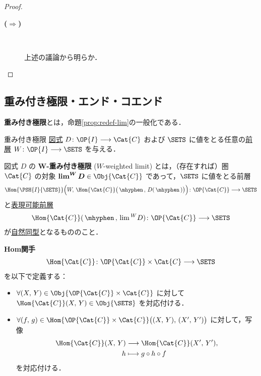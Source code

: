 \documentclass[TQFT_main]{subfiles}
\begin{document}
\begin{proof}
\begin{description}
        \item[\textbf{($\bm{\Longrightarrow}$)}]　
        
        上述の議論から明らか．
    \end{description}
\end{proof}

\subsection{重み付き極限・エンド・コエンド}

\textbf{重み付き極限}とは，命題\ref{prop:redef-lim}の一般化である．

\begin{mydef}[label=def:weighted-lim]{重み付き極限}
    \hyperref[def:diagram]{図式} $D \colon \OP{I} \lto \Cat{C}$ 
    および $\SETS$ に値をとる任意の\hyperref[def:presheaf-general]{前層} $W \colon \OP{I} \lto \SETS$ を与える．
    
    図式 $D$ の $\bm{W}$\textbf{-重み付き極限} ($W$-weighted limit) とは，（存在すれば）圏 $\Cat{C}$ の対象 $\bm{\lim^W D} \in \Obj{\Cat{C}}$ であって，$\SETS$ に値をとる前層
    \begin{align}
        \Hom{\PSH{I}{\SETS}} \Bigl( W,\, \Hom{\Cat{C}}\bigl(\, \mhyphen \,,\, D(\, \mhyphen \,) \bigr)  \Bigr) \colon \OP{\Cat{C}} \lto \SETS
    \end{align}
    と\hyperref[def:representable]{表現可能前層}
    \begin{align}
        \Hom{\Cat{C}} (\, \mhyphen \,,\, \lim{}^W D) \colon \OP{\Cat{C}} \lto \SETS
    \end{align}
    が\hyperref[def:nat]{自然同型}となるもののこと．
\end{mydef}

\textbf{Hom関手}
\begin{align}
    \label{def:Hom-funct}
    \Hom{\Cat{C}} \colon \OP{\Cat{C}} \times \Cat{C} \lto \SETS
\end{align}
を以下で定義する：
\begin{itemize}
    \item $\forall (X,\, Y) \in \Obj{\OP{\Cat{C}} \times \Cat{C}}$ に対して $\Hom{\Cat{C}} (X,\, Y) \in \Obj{\SETS}$ を対応付ける．
    \item $\forall (f,\, g) \in \Hom{\OP{\Cat{C}} \times \Cat{C}} \bigl( (X,\, Y),\, (X',\, Y') \bigr)$ に対して，写像
    \begin{align}
        \Hom{\Cat{C}} (X,\, Y) &\lto \Hom{\Cat{C}} (X',\, Y'), \\
        h &\lmto g \circ h \circ f
    \end{align}
    を対応付ける．
\end{itemize}
\end{document}
